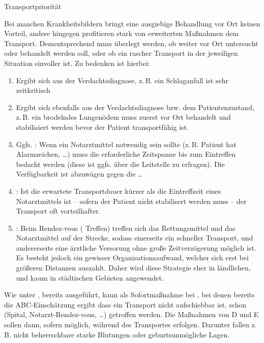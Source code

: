 \TextSlide
{Transportpriorität}
{%
%
\label{topic:transportprioritaet}%
Bei manchen Krankheitsbildern bringt eine ausgiebige
Behandlung vor Ort keinen Vorteil, andere hingegen
profitieren stark von erweiterten Maßnahmen  dem
Transport. Dementsprechend muss überlegt werden, ob weiter
vor Ort untersucht oder behandelt werden soll, oder ob ein
rascher Transport in der jeweiligen Situation sinvoller ist.
Zu bedenken ist hierbei:

\begin{enumerate}
  \item {} Ergibt sich aus der
  Verdachtsdiagnose, z.\,B. ein Schlaganfall ist sehr
  zeitkritisch
  \item {} Ergibt sich ebenfalls
  aus der Verdachtsdiagnose bzw. dem Patientenzustand, z.\,B.
  ein brodelndes Lungenödem muss zuerst vor Ort behandelt und stabilisiert werden
  bevor der Patient transportfähig ist.
  \item Ggfs. : Wenn
  ein Notarztmittel notwendig sein sollte (z.\,B. Patient hat
  Alarmzeichen, \ldots) muss die erforderliche Zeitspanne
  bis zum Eintreffen bedacht werden (diese ist ggfs. über
  die Leitstelle zu erfragen). Die Verfügbarkeit ist
  abzuwägen gegen die \ldots
  \item {}: Ist die
  erwartete Transportdauer kürzer als die Eintreffzeit eines
  Notarztmittels ist -- sofern der Patient nicht stabilisert
  werden muss -- der Transport oft vorteilhafter. 
  \item {}: Beim Rendez-vous (
  Treffen) treffen sich das Rettungsmittel und das
  Notarztmittel auf der Strecke, sodass einerseits ein
  schneller Transport, und andererseits eine ärztliche
  Versorung ohne große Zeitverzögerung möglich ist. Es
  besteht jedoch ein gewisser Organisationsaufwand, welcher
  sich erst bei größeren Distanzen auszahlt. Daher wird
  diese Strategie eher in ländlichen, und kaum in
  städtischen Gebieten angewendet.
\end{enumerate}

Wie unter ,
bereits ausgeführt, kann als Sofortmaßnahme bei 
, bei denen bereits die 
ABC-Einschätzung ergibt dass ein Transport nicht aufschiebbar ist, 
schon  (Spital, 
Notarzt-Rendez-vous, \ldots) getroffen werden. 
Die Maßnahmen von D und E sollen dann, sofern möglich, während des 
Transportes erfolgen. 
Darunter fallen z.\,B. nicht beherrschbare starke 
Blutungen oder geburtsunmögliche Lagen.

}

